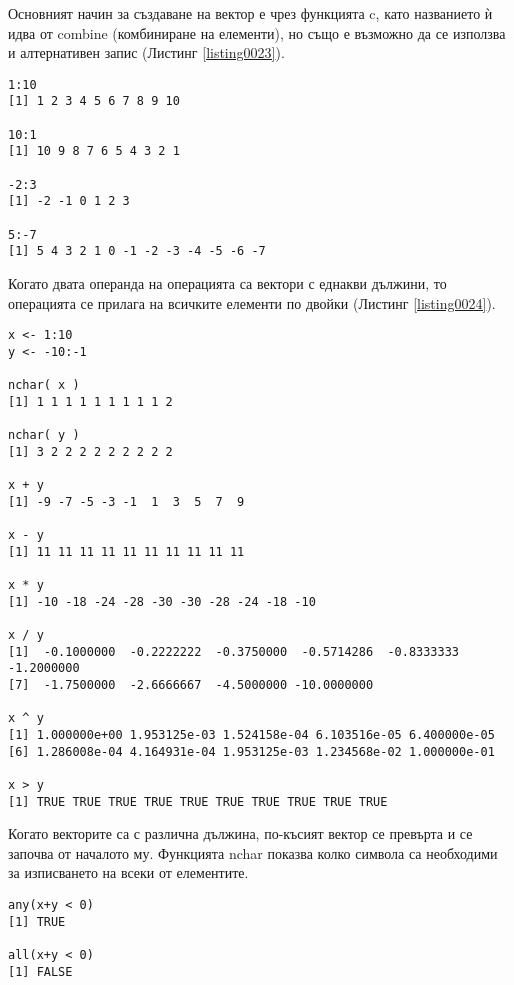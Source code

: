 Основният начин за създаване на вектор е чрез функцията c, като названието ѝ идва от combine (комбиниране на елементи), но също е възможно да се използва и алтернативен запис (Листинг \ref{listing0023}).

\begin{lstlisting}[caption=Алтернативен синтаксис за създаване на вектори, label=listing0023]
1:10
[1] 1 2 3 4 5 6 7 8 9 10

10:1
[1] 10 9 8 7 6 5 4 3 2 1

-2:3
[1] -2 -1 0 1 2 3

5:-7
[1] 5 4 3 2 1 0 -1 -2 -3 -4 -5 -6 -7
\end{lstlisting}

Когато двата операнда на операцията са вектори с еднакви дължини, то операцията се прилага на всичките елементи по двойки (Листинг \ref{listing0024}).

\begin{lstlisting}[caption=Операции между вектори с еднаква дължина, label=listing0024]
x <- 1:10
y <- -10:-1

nchar( x )
[1] 1 1 1 1 1 1 1 1 1 2

nchar( y )
[1] 3 2 2 2 2 2 2 2 2 2

x + y
[1] -9 -7 -5 -3 -1  1  3  5  7  9

x - y
[1] 11 11 11 11 11 11 11 11 11 11

x * y
[1] -10 -18 -24 -28 -30 -30 -28 -24 -18 -10

x / y
[1]  -0.1000000  -0.2222222  -0.3750000  -0.5714286  -0.8333333  -1.2000000
[7]  -1.7500000  -2.6666667  -4.5000000 -10.0000000

x ^ y
[1] 1.000000e+00 1.953125e-03 1.524158e-04 6.103516e-05 6.400000e-05
[6] 1.286008e-04 4.164931e-04 1.953125e-03 1.234568e-02 1.000000e-01

x > y
[1] TRUE TRUE TRUE TRUE TRUE TRUE TRUE TRUE TRUE TRUE
\end{lstlisting}

Когато векторите са с различна дължина, по-късият вектор се превърта и се започва от началото му. Функцията nchar показва колко символа са необходими за изписването на всеки от елементите.

\begin{lstlisting}[caption=Проверка дали някоя или всички стойности от вектора отговарят на определено условие, label=listing0025]
any(x+y < 0)
[1] TRUE

all(x+y < 0)
[1] FALSE
\end{lstlisting}

